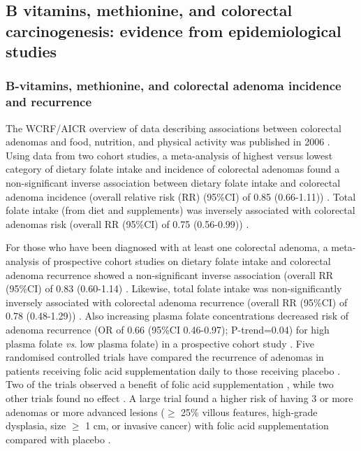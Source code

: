 \subsection{B vitamins, methionine, and colorectal carcinogenesis: evidence from epidemiological studies} %
 
\subsubsection{B-vitamins, methionine, and colorectal adenoma incidence and recurrence} %
\noindent The WCRF/AICR overview of data describing associations between colorectal adenomas and food, nutrition, and physical activity was published in 2006 \cite{c146}. Using data from two cohort studies, a meta-analysis of highest versus lowest category of dietary folate intake and incidence of colorectal adenomas found a non-significant inverse association between dietary folate intake and colorectal adenoma incidence (overall relative risk (RR) (95\%CI) of 0.85 (0.66-1.11)) \cite{c146}. Total folate intake (from diet and supplements) was inversely associated with colorectal adenomas risk (overall RR (95\%CI) of 0.75 (0.56-0.99)) \cite{c146}. 
 
\noindent For those who have been diagnosed with at least one colorectal adenoma, a meta-analysis of prospective cohort studies on dietary folate intake and colorectal adenoma recurrence showed a non-significant inverse association (overall RR (95\%CI) of 0.83 (0.60-1.14) \cite{c146}. Likewise, total folate intake was non-significantly inversely associated with colorectal adenoma recurrence (overall RR (95\%CI) of 0.78 (0.48-1.29)) \cite{c146}. Also increasing plasma folate concentrations decreased risk of adenoma recurrence (OR of 0.66 (95\%CI 0.46-0.97); P-trend=0.04) for high plasma folate \textit{vs}. low plasma folate) in a prospective cohort study \cite{c147}. Five randomised controlled trials have compared the recurrence of adenomas in patients receiving folic acid supplementation daily to those receiving placebo \cite{c148,c149,c150,c151,c152}. Two of the trials observed a benefit of folic acid supplementation \cite{c149,c151}, while two other trials found no effect \cite{c150,c152}. A large trial 
found a higher risk of having 3 or more adenomas or more advanced lesions ($\geq$ 25\% villous features, high-grade dysplasia, size $\geq$ 1 cm, or invasive cancer) with folic acid supplementation compared with placebo \cite{c148}. 
 
